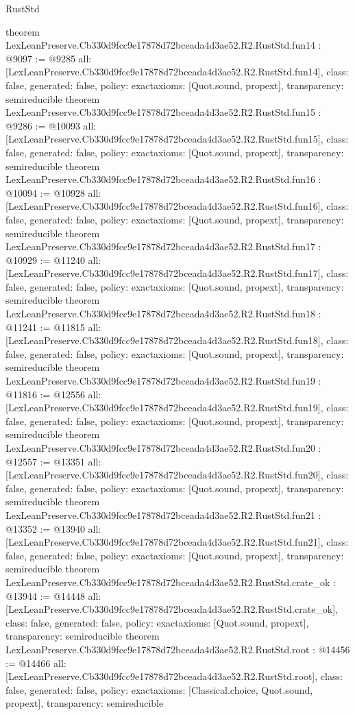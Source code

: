 \begin{lexlean}{RustStd}
\begin{coremodule}
{}
theorem LexLeanPreserve.Cb330d9fcc9e17878d72bceada4d3ae52.R2.RustStd.fun14 : @9097 := @9285 {
  all: [LexLeanPreserve.Cb330d9fcc9e17878d72bceada4d3ae52.R2.RustStd.fun14],
  class: false,
  generated: false,
  policy: exact{axioms: [Quot.sound, propext]},
  transparency: semireducible
}
theorem LexLeanPreserve.Cb330d9fcc9e17878d72bceada4d3ae52.R2.RustStd.fun15 : @9286 := @10093 {
  all: [LexLeanPreserve.Cb330d9fcc9e17878d72bceada4d3ae52.R2.RustStd.fun15],
  class: false,
  generated: false,
  policy: exact{axioms: [Quot.sound, propext]},
  transparency: semireducible
}
theorem LexLeanPreserve.Cb330d9fcc9e17878d72bceada4d3ae52.R2.RustStd.fun16 : @10094 := @10928 {
  all: [LexLeanPreserve.Cb330d9fcc9e17878d72bceada4d3ae52.R2.RustStd.fun16],
  class: false,
  generated: false,
  policy: exact{axioms: [Quot.sound, propext]},
  transparency: semireducible
}
theorem LexLeanPreserve.Cb330d9fcc9e17878d72bceada4d3ae52.R2.RustStd.fun17 : @10929 := @11240 {
  all: [LexLeanPreserve.Cb330d9fcc9e17878d72bceada4d3ae52.R2.RustStd.fun17],
  class: false,
  generated: false,
  policy: exact{axioms: [Quot.sound, propext]},
  transparency: semireducible
}
theorem LexLeanPreserve.Cb330d9fcc9e17878d72bceada4d3ae52.R2.RustStd.fun18 : @11241 := @11815 {
  all: [LexLeanPreserve.Cb330d9fcc9e17878d72bceada4d3ae52.R2.RustStd.fun18],
  class: false,
  generated: false,
  policy: exact{axioms: [Quot.sound, propext]},
  transparency: semireducible
}
theorem LexLeanPreserve.Cb330d9fcc9e17878d72bceada4d3ae52.R2.RustStd.fun19 : @11816 := @12556 {
  all: [LexLeanPreserve.Cb330d9fcc9e17878d72bceada4d3ae52.R2.RustStd.fun19],
  class: false,
  generated: false,
  policy: exact{axioms: [Quot.sound, propext]},
  transparency: semireducible
}
theorem LexLeanPreserve.Cb330d9fcc9e17878d72bceada4d3ae52.R2.RustStd.fun20 : @12557 := @13351 {
  all: [LexLeanPreserve.Cb330d9fcc9e17878d72bceada4d3ae52.R2.RustStd.fun20],
  class: false,
  generated: false,
  policy: exact{axioms: [Quot.sound, propext]},
  transparency: semireducible
}
theorem LexLeanPreserve.Cb330d9fcc9e17878d72bceada4d3ae52.R2.RustStd.fun21 : @13352 := @13940 {
  all: [LexLeanPreserve.Cb330d9fcc9e17878d72bceada4d3ae52.R2.RustStd.fun21],
  class: false,
  generated: false,
  policy: exact{axioms: [Quot.sound, propext]},
  transparency: semireducible
}
theorem LexLeanPreserve.Cb330d9fcc9e17878d72bceada4d3ae52.R2.RustStd.crate_ok : @13944 := @14448 {
  all: [LexLeanPreserve.Cb330d9fcc9e17878d72bceada4d3ae52.R2.RustStd.crate_ok],
  class: false,
  generated: false,
  policy: exact{axioms: [Quot.sound, propext]},
  transparency: semireducible
}
theorem LexLeanPreserve.Cb330d9fcc9e17878d72bceada4d3ae52.R2.RustStd.root : @14456 := @14466 {
  all: [LexLeanPreserve.Cb330d9fcc9e17878d72bceada4d3ae52.R2.RustStd.root],
  class: false,
  generated: false,
  policy: exact{axioms: [Classical.choice, Quot.sound, propext]},
  transparency: semireducible
}


\end{coremodule}
\end{lexlean}
